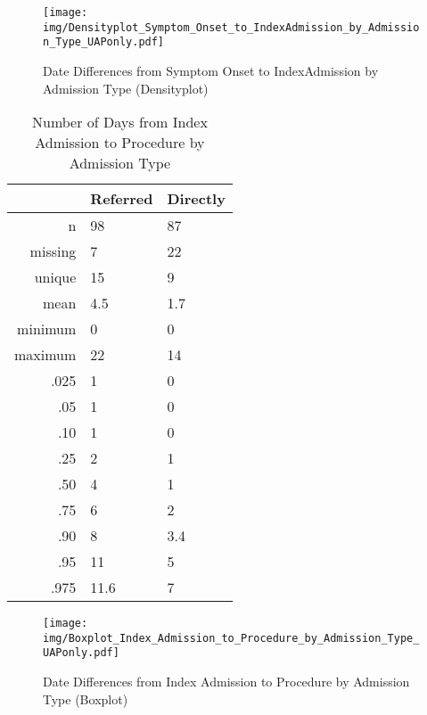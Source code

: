 \documentclass[presentation,xcolor=pdftex,dvipsnames,table,11pt]{beamer}
\begin{document}
\begin{tiny}
\begin{frame}
\begin{figure}
  \centering
  \caption{Date Differences from Symptom Onset to IndexAdmission by Admission Type (Densityplot)}
  \label{Density: Date Differences from Symptom Onset to IndexAdmission by Admission Type}
\texttt{[image: img/Densityplot\_Symptom\_Onset\_to\_IndexAdmission\_by\_Admission\_Type\_UAPonly.pdf]}\end{figure}
\end{frame}




\begin{table}[ht]
\centering
\begin{tabular}{rll}
  \toprule
 & Referred & Directly \\ 
  \midrule
n & 98 & 87 \\ 
  missing & 7 & 22 \\ 
  unique & 15 & 9 \\ 
  mean & 4.5 & 1.7 \\ 
  minimum & 0 & 0 \\ 
  maximum & 22 & 14 \\ 
  .025 & 1 & 0 \\ 
  .05 & 1 & 0 \\ 
  .10 & 1 & 0 \\ 
  .25 & 2 & 1 \\ 
  .50 & 4 & 1 \\ 
  .75 & 6 & 2 \\ 
  .90 & 8 & 3.4 \\ 
  .95 & 11 & 5 \\ 
  .975 & 11.6 & 7 \\ 
   \bottomrule
\end{tabular}
\caption{Number of Days from Index Admission to Procedure by Admission Type} 
\end{table}
\begin{frame}
\begin{figure}
  \centering
  \caption{Date Differences from Index Admission to Procedure by Admission Type (Boxplot)}
  \label{Boxplot: Date Differences from Index Admission to Procedure by Admission Type}
\texttt{[image: img/Boxplot\_Index\_Admission\_to\_Procedure\_by\_Admission\_Type\_UAPonly.pdf]}\end{figure}
\end{frame}



\end{tiny}
\end{document}
